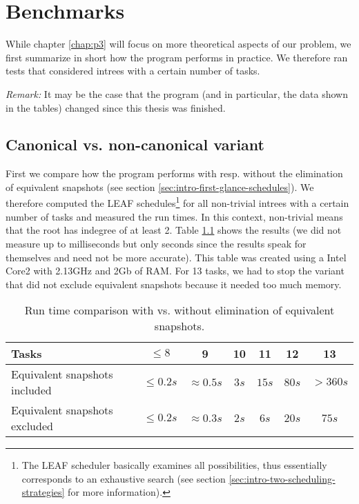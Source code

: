 \chapter{Benchmarks}
\label{chap:benchmarks}

While chapter \ref{chap:p3} will focus on more theoretical aspects of our problem, we first summarize in short how the program performs in practice. We therefore ran tests that considered intrees with a certain number of tasks.

\emph{Remark:} It may be the case that the program (and in particular, the data shown in the tables) changed since this thesis was finished.

\section{Canonical vs. non-canonical variant}
\label{sec:benchmark-canonical-vs-non-canonical}

First we compare how the program performs with resp. without the elimination of equivalent snapshots (see section \ref{sec:intro-first-glance-schedules}). We therefore computed the LEAF schedules\footnote{The LEAF scheduler basically examines all possibilities, thus essentially corresponds to an exhaustive search (see section \ref{sec:intro-two-scheduling-strategies} for more information).} for all non-trivial intrees with a certain number of tasks and measured the run times. In this context, non-trivial means that the root has indegree of at least 2. Table \ref{tab:comparison-canonical-vs-non-canonical} shows the results (we did not measure up to milliseconds but only seconds since the results speak for themselves and need not be more accurate). This table was created using a Intel Core2 with 2.13GHz and 2Gb of RAM. For 13 tasks, we had to stop the variant that did not exclude equivalent snapshots because it needed too much memory. 

\begin{table}[th]
  \centering
  \begin{tabular}[ht]{lcccccc}
    Tasks                         & $\leq 8$    & 9 & 10 & 11 & 12 & 13 \\
    \hline
    Equivalent snapshots included & $\leq 0.2s$ & $\approx 0.5s$ & $3s$ & $15s$ & $80s$ & $>360s$ \\
    Equivalent snapshots excluded & $\leq 0.2s$ & $\approx 0.3s$ & $2s$ & $6s$ & $20s$ & $75s$
  \end{tabular}
  \caption{Run time comparison with vs. without elimination of equivalent snapshots.}
  \label{tab:comparison-canonical-vs-non-canonical}
\end{table}

